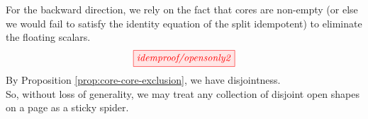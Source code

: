 \begin{myboxR}
For the backward direction, we rely on the fact that cores are non-empty (or else we would fail to satisfy the identity equation of the split idempotent) to eliminate the floating scalars.
\[\scalebox{1}{\tikzfig{idemproof/opensonly2}}\]
By Proposition \ref{prop:core-core-exclusion}, we have disjointness.\\

So, without loss of generality, we may treat any collection of disjoint open shapes on a page as a sticky spider.
\end{myboxR}

\clearpage